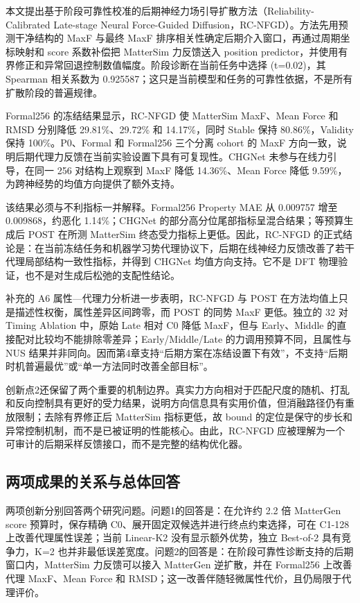 本文提出基于阶段可靠性校准的后期神经力场引导扩散方法（Reliability-Calibrated Late-stage Neural Force-Guided Diffusion，RC-NFGD）。方法先用预测干净结构的 MaxF 与最终 MaxF 排序相关性确定后期介入窗口，再通过周期坐标映射和 score 系数补偿把 Matter\allowbreak Sim 力反馈送入 position predictor，并使用有界修正和异常回退控制数值幅度。阶段诊断在当前任务中选择 (t=0.02)，其 Spearman 相关系数为 0.925587；这只是当前模型和任务的可靠性依据，不是所有扩散阶段的普遍规律。

Formal256 的冻结结果显示，RC-NFGD 使 Matter\allowbreak Sim MaxF、Mean Force 和 RMSD 分别降低 29.81\%、29.72\% 和 14.17\%，同时 Stable 保持 80.86\%，Validity 保持 100\%。P0、Formal 和 Formal256 三个分离 cohort 的 MaxF 方向一致，说明后期代理力反馈在当前实验设置下具有可复现性。CHGNet 未参与在线力引导，在同一 256 对结构上观察到 MaxF 降低 14.36\%、Mean Force 降低 9.59\%，为跨神经势的均值方向提供了额外支持。

该结果必须与不利指标一并解释。Formal256 Property MAE 从 0.009757 增至 0.009868，约恶化 1.14\%；CHGNet 的部分高分位尾部指标呈混合结果；等预算生成后 POST 在所测 Matter\allowbreak Sim 终态受力指标上更低。因此，RC-NFGD 的正式结论是：在当前冻结任务和机器学习势代理协议下，后期在线神经力反馈改善了若干代理局部结构一致性指标，并得到 CHGNet 均值方向支持。它不是 DFT 物理验证，也不是对生成后松弛的支配性结论。

补充的 A6 属性---代理力分析进一步表明，RC-NFGD 与 POST 在方法均值上只是描述性权衡，属性差异区间跨零，而 POST 的同势 MaxF 更低。独立的 32 对 Timing Ablation 中，原始 Late 相对 C0 降低 MaxF，但与 Early、Middle 的直接配对比较均不能排除零差异；Early/Middle/Late 的力调用预算不同，且属性与 NUS 结果并非同向。因而第4章支持“后期方案在冻结设置下有效”，不支持“后期时机普遍最优”或“单一方法同时改善全部目标”。


创新点2还保留了两个重要的机制边界。真实力方向相对于匹配尺度的随机、打乱和反向控制具有更好的受力结果，说明方向信息具有实用价值，但消融路径仍有重放限制；去除有界修正后 Matter\allowbreak Sim 指标更低，故 bound 的定位是保守的步长和异常控制机制，而不是已被证明的性能核心。由此，RC-NFGD 应被理解为一个可审计的后期采样反馈接口，而不是完整的结构优化器。

\subsection{两项成果的关系与总体回答}

两项创新分别回答两个研究问题。问题1的回答是：在允许约 2.2 倍 MatterGen score 预算时，保存精确 C0、展开固定双候选并进行终点约束选择，可在 C1-128 上改善代理属性误差；当前 Linear-K2 没有显示额外优势，独立 Best-of-2 具有竞争力，K=2 也并非最低误差宽度。问题2的回答是：在阶段可靠性诊断支持的后期窗口内，Matter\allowbreak Sim 力反馈可以接入 MatterGen 逆扩散，并在 Formal256 上改善代理 MaxF、Mean Force 和 RMSD；这一改善伴随轻微属性代价，且仍局限于代理评价。

